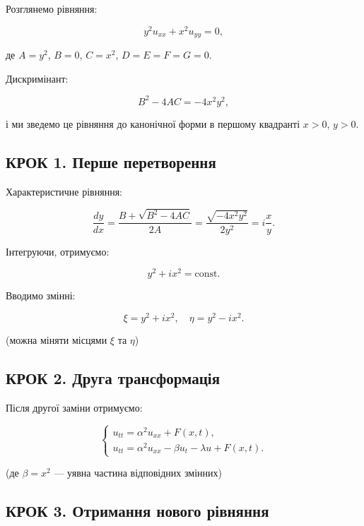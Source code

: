 \documentclass[
  ukrainian,
]{article}
\begin{document}
Розглянемо рівняння:

\[
y^2 u_{xx} + x^2 u_{yy} = 0,
\]

де \(A = y^2\), \(B = 0\), \(C = x^2\), \(D = E = F = G = 0\).

Дискримінант:

\[
B^2 - 4AC = -4x^2 y^2,
\]

і ми зведемо це рівняння до канонічної форми в першому квадранті
\(x > 0\), \(y > 0\).

\subsection{КРОК 1. Перше
перетворення}\label{ux43aux440ux43eux43a-1.-ux43fux435ux440ux448ux435-ux43fux435ux440ux435ux442ux432ux43eux440ux435ux43dux43dux44f}

Характеристичне рівняння:

\[
\frac{dy}{dx} = \frac{B + \sqrt{B^2 - 4AC}}{2A} = \frac{\sqrt{-4x^2 y^2}}{2y^2} = i \frac{x}{y}.
\]

Інтегруючи, отримуємо:

\[
y^2 + i x^2 = \text{const}.
\]

Вводимо змінні:

\[
\xi = y^2 + i x^2, \quad \eta = y^2 - i x^2.
\]

(можна міняти місцями \(\xi\) та \(\eta\))

\subsection{КРОК 2. Друга
трансформація}\label{ux43aux440ux43eux43a-2.-ux434ux440ux443ux433ux430-ux442ux440ux430ux43dux441ux444ux43eux440ux43cux430ux446ux456ux44f}

Після другої заміни отримуємо:

\[
\begin{cases}
u_{tt} = \alpha^2 u_{xx} + F(x,t), \\
u_{tt} = \alpha^2 u_{xx} - \beta u_t - \lambda u + F(x,t).
\end{cases}
\]

(де \(\beta = x^2\) --- уявна частина відповідних змінних)

\subsection{КРОК 3. Отримання нового
рівняння}\label{ux43aux440ux43eux43a-3.-ux43eux442ux440ux438ux43cux430ux43dux43dux44f-ux43dux43eux432ux43eux433ux43e-ux440ux456ux432ux43dux44fux43dux43dux44f}
\end{document}

